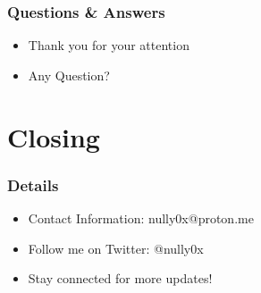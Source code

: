 \documentclass[aspectratio=169]{beamer}
\begin{document}
\begin{frame}
\frametitle{Questions \& Answers}
\begin{itemize}
     \item Thank you for your attention
     \item Any Question?
\end{itemize}
\end{frame}

\section{Closing}

\begin{frame}
\frametitle{Details}
\begin{itemize}
    \item Contact Information: nully0x@proton.me
    \item Follow me on Twitter: @nully0x
    \item Stay connected for more updates!
\end{itemize}
\end{frame}
\end{document}
